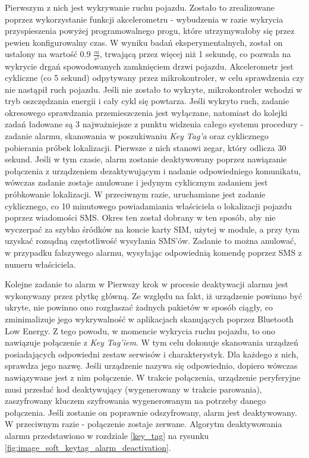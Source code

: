 Pierwszym z nich jest wykrywanie ruchu pojazdu. Zostało to zrealizowane poprzez wykorzystanie funkcji akcelerometru - wybudzenia w razie wykrycia przyspieszenia powyżej programowalnego progu, które utrzymywałoby się przez pewien konfigurowalny czas. W wyniku badań eksperymentalnych, został on ustalony na wartość 0.9 $\frac{m}{s^2}$, trwającą przez więcej niż 1 sekundę, co pozwala na wykrycie drgań spowodowanych zamknięciem drzwi pojazdu. Akcelerometr jest cykliczne (co 5 sekund) odpytywany przez mikrokontroler, w celu sprawdzenia czy nie nastąpił ruch pojazdu. Jeśli nie zostało to wykryte, mikrokontroler wchodzi w tryb oszczędzania energii i cały cykl się powtarza. Jeśli wykryto ruch, zadanie okresowego sprawdzania przemieszczenia jest wyłączane, natomiast do kolejki zadań ładowane są 3 najważniejsze z punktu widzenia całego systemu procedury - zadanie alarmu, skanowania w poszukiwaniu \textit{Key Tag'a} oraz cyklicznego pobierania próbek lokalizacji. Pierwsze z nich stanowi zegar, który odlicza 30 sekund. Jeśli w tym czasie, alarm zostanie deaktywowany poprzez nawiązanie połączenia z urządzeniem dezaktywującym i nadanie odpowiedniego komunikatu, wówczas zadanie zostaje anulowane i jedynym cyklicznym zadaniem jest próbkowanie lokalizacji. W przeciwnym razie, uruchamiane jest zadanie cyklicznego, co 10 minutowego powiadamiania właściciela o lokalizacji pojazdu poprzez wiadomości SMS. Okres ten został dobrany w ten sposób, aby nie wyczerpać za szybko śródków na koncie karty SIM, użytej w module, a przy tym uzyskać rozsądną częstotliwość wysyłania SMS'ów. Zadanie to można anulować, w przypadku fałszywego alarmu, wysyłając odpowiednią komendę poprzez SMS z numeru właściciela. 

Kolejne zadanie to alarm w Pierwszy krok w procesie deaktywacji alarmu jest wykonywany przez płytkę główną. Ze względu na fakt, iż urządzenie powinno być ukryte, nie powinno ono rozgłaszać żadnych pakietów w sposób ciągły, co zminimalizuje jego wykrywalność w aplikacjach skanujących poprzez Bluetooth Low Energy. Z tego powodu, w momencie wykrycia ruchu pojazdu, to ono nawiązuje połączenie z \textit{Key Tag'iem}. W tym celu dokonuje skanowania urządzeń posiadających odpowiedni zestaw serwisów i charakterystyk. Dla każdego z nich, sprawdza jego nazwę. Jeśli urządzenie nazywa się odpowiednio, dopiero wówczas nawiązywane jest z nim połączenie. W trakcie połączenia, urządzenie peryferyjne musi przesłać kod deaktywujący (wygenerowany w trakcie parowania), zaszyfrowany kluczem szyfrowania wygenerowanym na potrzeby danego połączenia. Jeśli zostanie on poprawnie odszyfrowany, alarm jest deaktywowany. W przeciwnym razie - połączenie zostaje zerwane. Algorytm deaktywowania alarmu przedstawiono w rozdziale \ref{key_tag} na rysunku \ref{fig:image_soft_keytag_alarm_deactivation}.


